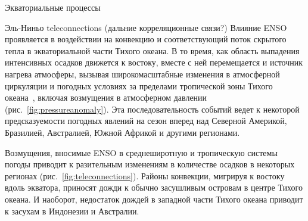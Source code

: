 \begin{chapter}{Экваториальные процессы}
\begin{section}{Эль-Ниньо teleconnections (дальние корреляционные связи?)}
Влияние ENSO
проявляется в воздействии на конвекцию и соответствующий поток скрытого тепла 
в экваториальной части Тихого океана. В то время, как область выпадения 
интенсивных осадков движется к востоку, вместе с ней перемещается и источник
нагрева атмосферы, вызывая широкомасштабные изменения в атмосферной циркуляции
и погодных условиях за пределами тропической зоны Тихого 
океана~\cite{McPhaden:2006}, включая возмущения в атмосферном
давлении (рис.~\ref{fig:pressureanomaly}). Эта последовательность событий
ведет к некоторой предсказуемости погодных явлений на сезон вперед
над Северной Америкой, Бразилией, Австралией, Южной Африкой и другими 
регионами.
%

Возмущения, вносимые ENSO в среднеширотную и тропическую системы погоды
приводит к разительным изменениям в количестве осадков%
 в некоторых
регионах (рис.~\ref{fig:teleconnections}). Районы конвекции, мигрируя к востоку 
вдоль экватора, приносят дожди к обычно засушливым островам в центре
Тихого океана. И наоборот, недостаток дождей в западной части Тихого океана
приводит к засухам в Индонезии и Австралии.
%


\end{section}
\end{chapter}
